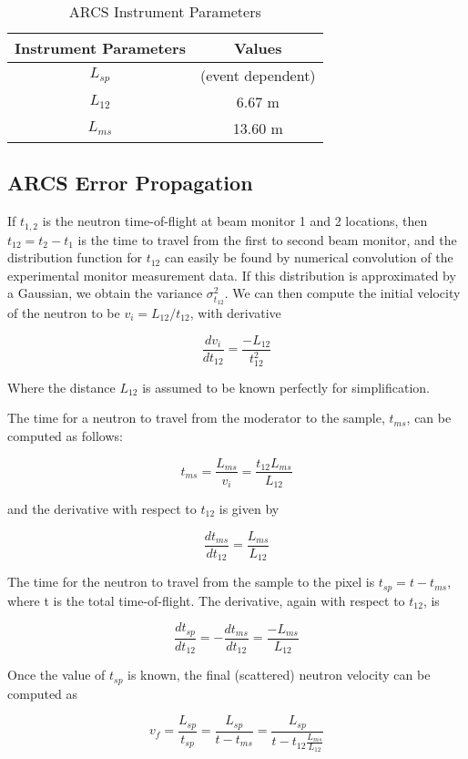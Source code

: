 \documentclass[aps,prl,twocolumn,groupedaddress]{revtex4-1}
\begin{document}
\begin{table}[H]
\centering
\caption{ARCS Instrument Parameters}
\begin{tabular}{|c|c|}
\hline
Instrument Parameters & Values \\ \hline
$L_{sp}$ & (event dependent) \\ \hline
$L_{12}$ & 6.67 m \\ \hline
$L_{ms}$ & 13.60 m \\ \hline

\end{tabular}
\end{table}

\subsection{ARCS Error Propagation}

If $t_{1,2}$ is the neutron time-of-flight at beam monitor 1 and 2 locations, then $t_12 = t_2 - t_1$ is the time to travel from the first to second beam monitor, and the distribution function for $t_{12}$ can easily be found by numerical convolution of the experimental monitor measurement data.  If this distribution is approximated by a Gaussian, we obtain the variance $\sigma_{t_{12}}^2$.  We can then compute the initial velocity of the neutron to be $v_i = L_{12} / t_{12}$, with derivative

$$
\frac{dv_i}{dt_{12}} = \frac{-L_{12}}{t_{12}^2}
$$

Where the distance $L_{12}$ is assumed to be known perfectly for simplification.

The time for a neutron to travel from the moderator to the sample, $t_{ms}$, can be computed as follows:

$$
t_{ms} = \frac{L_{ms}}{v_i} = \frac{t_{12}L_{ms}}{L_{12}}
$$

and the derivative with respect to $t_{12}$ is given by

$$
\frac{dt_{ms}}{dt_{12}} = \frac{L_{ms}}{L_{12}}
$$

The time for the neutron to travel from the sample to the pixel is $t_{sp} = t - t_{ms}$, where t is the  total time-of-flight.  The derivative, again with respect to $t_{12}$, is

$$
\frac{dt_{sp}}{dt_{12}} = - \frac{dt_{ms}}{dt_{12}} = \frac{-L_{ms}}{L_{12}}
$$

Once the value of $t_{sp}$ is known, the final (scattered) neutron velocity can be computed as

$$
v_f = \frac{L_{sp}}{t_{sp}} = \frac{L_{sp}}{t - t_{ms}} = \frac{L_{sp}}{t - t_{12} \frac{L_{ms}}{L_{12}}}
$$
\end{document}
